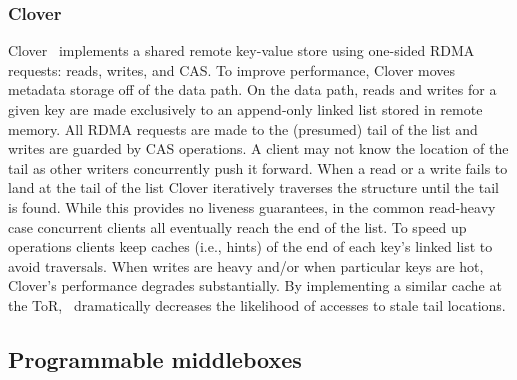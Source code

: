 
\subsubsection{Clover}

Clover~\cite{clover} implements a shared remote key-value store using
one-sided RDMA requests: reads, writes, and CAS.  To improve
performance, Clover moves metadata storage off of the data path. On
the data path, reads and writes for a given key are made exclusively
to an append-only linked list stored in remote memory. All RDMA
requests are made to the (presumed) tail of the list and writes are
guarded by CAS operations. A client may not know the location of the
tail as other writers concurrently push it forward. When a read or a
write fails to land at the tail of the list Clover iteratively
traverses the structure until the tail is found. While this provides
no liveness guarantees, in the common read-heavy case concurrent
clients all eventually reach the end of the list. To speed up
operations clients keep caches (i.e., hints) of the end of each key's
linked list to avoid traversals. When writes are heavy and/or when
particular keys are hot, Clover's performance degrades substantially.
By implementing a similar cache at the ToR, \sword\ dramatically
decreases the likelihood of accesses to stale tail locations.



\subsection{Programmable middleboxes}

